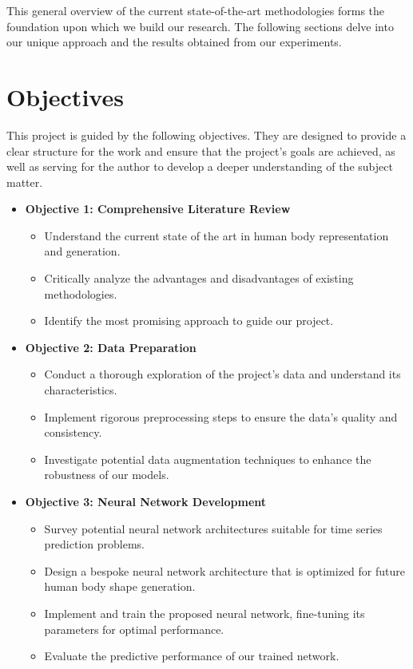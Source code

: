 This general overview of the current state-of-the-art methodologies forms the
foundation upon which we build our research. The following sections delve into
our unique approach and the results obtained from our experiments.

\section{Objectives}\label{objectives}

This project is guided by the following objectives. They are designed to
provide a clear structure for the work and ensure that the project's goals are
achieved, as well as serving for the author to develop a deeper understanding
of the subject matter.

\begin{itemize}
	\item \textbf{Objective 1: Comprehensive Literature Review}
	      \begin{itemize}
		      \item Understand the current state of the art in human body representation and
		            generation.
		      \item Critically analyze the advantages and disadvantages of existing methodologies.
		      \item Identify the most promising approach to guide our project.
	      \end{itemize}

	\item \textbf{Objective 2: Data Preparation}
	      \begin{itemize}
		      \item Conduct a thorough exploration of the project's data and understand its
		            characteristics.
		      \item Implement rigorous preprocessing steps to ensure the data's quality and
		            consistency.
		      \item Investigate potential data augmentation techniques to enhance the robustness of
		            our models.
	      \end{itemize}

	\item \textbf{Objective 3: Neural Network Development}
	      \begin{itemize}
		      \item Survey potential neural network architectures suitable for time series
		            prediction problems.
		      \item Design a bespoke neural network architecture that is optimized for future human
		            body shape generation.
		      \item Implement and train the proposed neural network, fine-tuning its parameters for
		            optimal performance.
		      \item Evaluate the predictive performance of our trained network.
	      \end{itemize}


\end{itemize}
